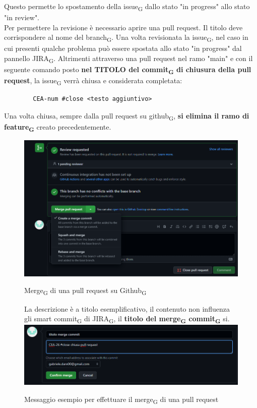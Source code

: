 	Questo permette lo spostamento della issue\textsubscript{G} dallo stato "in progress" allo stato "in review".\\
	Per permettere la revisione è necessario aprire una pull request. Il titolo deve corrispondere al nome del branch\textsubscript{G}.
	Una volta revisionata la issue\textsubscript{G}, nel caso in cui presenti qualche problema può essere spostata allo stato "in progress" dal pannello JIRA\textsubscript{G}. Altrimenti attraverso una pull request nel ramo "main" e con il seguente comando posto \textbf{nel TITOLO del commit\textsubscript{G} di chiusura della pull request}, la issue\textsubscript{G} verrà chiusa e considerata completata:
	\begin{lstlisting}
		CEA-num #close <testo aggiuntivo>
	\end{lstlisting}
	Una volta chiusa, sempre dalla pull request su github\textsubscript{G}, \textbf{si elimina il ramo di feature\textsubscript{G}} creato precedentemente.
	\begin{figure}[ht!]
		\includegraphics[width=15cm]{img/git_pull_request.png}
		\caption{Merge\textsubscript{G} di una pull request su Github\textsubscript{G}}
		La descrizione è a titolo esemplificativo, il contenuto non influenza gli smart commit\textsubscript{G} di JIRA\textsubscript{G}, il \textbf{titolo del merge\textsubscript{G} commit\textsubscript{G}} si.
		\newline \includegraphics[width=15cm]{img/git_pull_request_commit.png}
		\caption{Messaggio esempio per effettuare il merge\textsubscript{G} di una pull request}
	\end{figure}
	\clearpage

